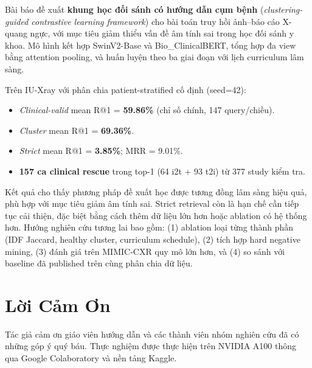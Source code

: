\documentclass[12pt, a4paper]{article}
\begin{document}
Bài báo đề xuất \textbf{khung học đối sánh có hướng dẫn cụm bệnh}
(\textit{clustering-guided contrastive learning framework}) cho bài toán truy
hồi ảnh--báo cáo X-quang ngực, với mục tiêu giảm thiểu vấn đề âm tính sai
trong học đối sánh y khoa. Mô hình kết hợp SwinV2-Base và Bio\_ClinicalBERT,
tổng hợp đa view bằng attention pooling, và huấn luyện theo ba giai đoạn với
lịch curriculum lâm sàng.

Trên IU-Xray với phân chia patient-stratified cố định (seed=42):
\begin{itemize}
  \item \textit{Clinical-valid} mean R@1 = \textbf{59.86\%}
    (chỉ số chính, 147 query/chiều).
  \item \textit{Cluster} mean R@1 = \textbf{69.36\%}.
  \item \textit{Strict} mean R@1 = \textbf{3.85\%}; MRR = 9.01\%.
  \item \textbf{157 ca clinical rescue} trong top-1 (64 i2t + 93 t2i)
    từ 377 study kiểm tra.
\end{itemize}

Kết quả cho thấy phương pháp đề xuất học được tương đồng lâm sàng hiệu quả,
phù hợp với mục tiêu giảm âm tính sai. Strict retrieval còn là hạn chế cần
tiếp tục cải thiện, đặc biệt bằng cách thêm dữ liệu lớn hơn hoặc ablation
có hệ thống hơn. Hướng nghiên cứu tương lai bao gồm: (1) ablation loại từng
thành phần (IDF Jaccard, healthy cluster, curriculum schedule), (2) tích hợp
hard negative mining, (3) đánh giá trên MIMIC-CXR quy mô lớn hơn, và
(4) so sánh với baseline đã published trên cùng phân chia dữ liệu.

\section*{Lời Cảm Ơn}

Tác giả cảm ơn giáo viên hướng dẫn và các thành viên nhóm nghiên cứu đã có
những góp ý quý báu. Thực nghiệm được thực hiện trên NVIDIA A100 thông qua
Google Colaboratory và nền tảng Kaggle.
\end{document}
